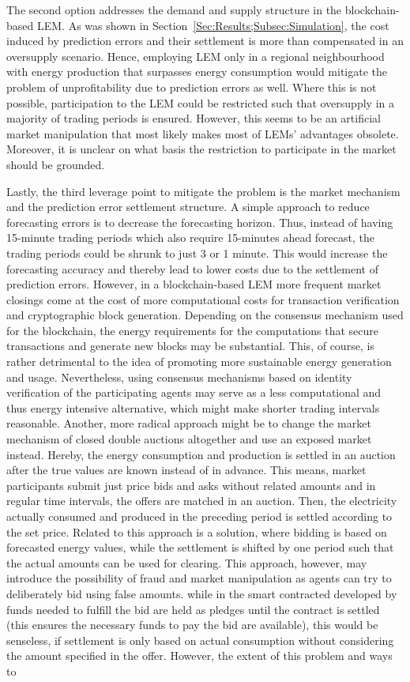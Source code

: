The second option addresses the demand and supply structure in the blockchain-based LEM. As was shown in Section~\ref{Sec:Results;Subsec:Simulation}, the cost induced by prediction errors and their settlement is more than compensated in an oversupply scenario. Hence, employing LEM only in a regional neighbourhood with energy production that surpasses energy consumption would mitigate the problem of unprofitability due to prediction errors as well. Where this is not possible, participation to the LEM could be restricted such that oversupply in a majority of trading periods is ensured. However, this seems to be an artificial market manipulation that most likely makes most of LEMs' advantages obsolete. Moreover, it is unclear on what basis the restriction to participate in the market should be grounded.

Lastly, the third leverage point to mitigate the problem is the market mechanism and the prediction error settlement structure. A simple approach to reduce forecasting errors is to decrease the forecasting horizon. Thus, instead of having 15-minute trading periods which also require 15-minutes ahead forecast, the trading periods could be shrunk to just 3 or 1 minute. This would increase the forecasting accuracy and thereby lead to lower costs due to the settlement of prediction errors. However, in a blockchain-based LEM more frequent market closings come at the cost of more computational costs for transaction verification and cryptographic block generation. Depending on the consensus mechanism used for the blockchain, the energy requirements for the computations that secure transactions and generate new blocks may be substantial. This, of course, is rather detrimental to the idea of promoting more sustainable energy generation and usage. Nevertheless, using consensus mechanisms based on identity verification of the participating agents may serve as a less computational and thus energy intensive alternative, which might make shorter trading intervals reasonable. Another, more radical approach might be to change the market mechanism of closed double auctions altogether and use an exposed market instead. Hereby, the energy consumption and production is settled in an auction after the true values are known instead of in advance. This means, market participants submit just price bids and asks without related amounts and in regular time intervals, the offers are matched in an auction. Then, the electricity actually consumed and produced in the preceding period is settled according to the set price. Related to this approach is a solution, where bidding is based on forecasted energy values, while the settlement is shifted by one period such that the actual amounts can be used for clearing. This approach, however, may introduce the possibility of fraud and market manipulation as agents can try to deliberately bid using false amounts. while in the smart contracted developed by \citet{Mengelkamp:2018a} funds needed to fulfill the bid are held as pledges until the contract is settled (this ensures the necessary funds to pay the bid are available), this would be senseless, if settlement is only based on actual consumption without considering the amount specified in the offer. However, the extent of this problem and ways to 
